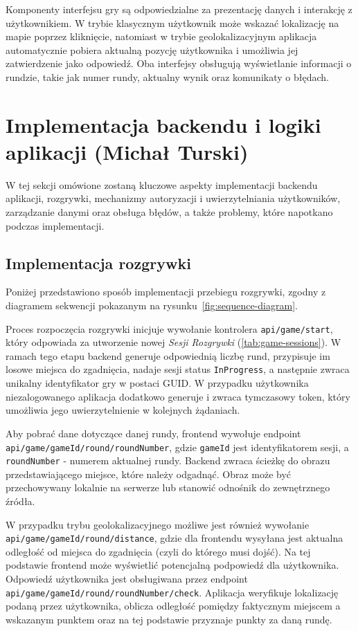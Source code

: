 Komponenty interfejsu gry są odpowiedzialne za prezentację danych i interakcję z użytkownikiem. W trybie klasycznym użytkownik może wskazać lokalizację na mapie poprzez kliknięcie, natomiast w trybie geolokalizacyjnym aplikacja automatycznie pobiera aktualną pozycję użytkownika i umożliwia jej zatwierdzenie jako odpowiedź. Oba interfejsy obsługują wyświetlanie informacji o rundzie, takie jak numer rundy, aktualny wynik oraz komunikaty o błędach.

\section{Implementacja backendu i logiki aplikacji (Michał Turski)}

W tej sekcji omówione zostaną kluczowe aspekty implementacji backendu aplikacji, rozgrywki, mechanizmy autoryzacji i uwierzytelniania użytkowników, zarządzanie danymi oraz obsługa błędów, a także problemy, które napotkano podczas implementacji.

\subsection{Implementacja rozgrywki}


Poniżej przedstawiono sposób implementacji przebiegu rozgrywki, zgodny z diagramem sekwencji pokazanym na rysunku~\ref{fig:sequence-diagram}.

Proces rozpoczęcia rozgrywki inicjuje wywołanie kontrolera \texttt{api/game/start}, który odpowiada za utworzenie nowej \textit{Sesji Rozgrywki} (\ref{tab:game-sessions}).
W ramach tego etapu backend generuje odpowiednią liczbę rund, przypisuje im losowe miejsca do zgadnięcia, nadaje sesji status \texttt{InProgress}, a następnie zwraca unikalny identyfikator gry w postaci GUID.
W przypadku użytkownika niezalogowanego aplikacja dodatkowo generuje i zwraca tymczasowy token, który umożliwia jego uwierzytelnienie w kolejnych żądaniach.

Aby pobrać dane dotyczące danej rundy, frontend wywołuje endpoint
\linebreak \texttt{api/game/{gameId}/round/{roundNumber}},
gdzie \texttt{gameId} jest identyfikatorem sesji, a \texttt{roundNumber} - numerem aktualnej rundy. Backend zwraca ścieżkę do obrazu przedstawiającego miejsce, które należy odgadnąć. Obraz może być przechowywany lokalnie na serwerze lub stanowić odnośnik do zewnętrznego źródła.

W przypadku trybu geolokalizacyjnego możliwe jest również wywołanie \linebreak
\texttt{api/game/{gameId}/round/distance},
gdzie dla frontendu wysyłana jest aktualna odległość od miejsca do zgadnięcia (czyli do którego musi dojść). Na tej podstawie frontend może wyświetlić potencjalną podpowiedź dla użytkownika.
Odpowiedź użytkownika jest obsługiwana przez endpoint \linebreak
\texttt{api/game/{gameId}/round/{roundNumber}/check}.
Aplikacja weryfikuje lokalizację podaną przez użytkownika, oblicza odległość pomiędzy faktycznym miejscem a wskazanym punktem oraz na tej podstawie przyznaje punkty za daną rundę.

